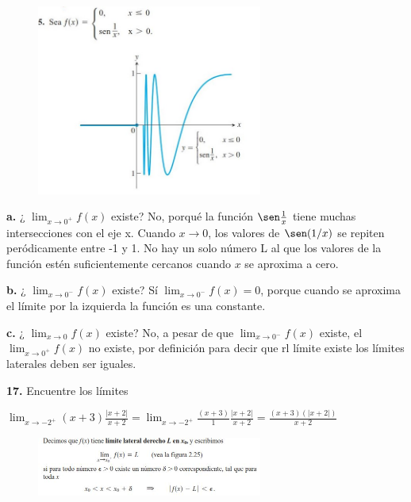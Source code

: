 \documentclass[12pt, letterpaper]{article}
\begin{document}
\begin{figure}[tbh]
\centering
\includegraphics[width=20em]{t11dos}
\end{figure}


\textbf{a.} ¿  $\lim_{ x \to 0^+} f(x)$ existe? No, porqué la función $\sen \frac{1}{x}$ tiene muchas intersecciones con el eje x. Cuando $x \to 0$, los valores de $ \sen (1/x)$ se repiten peródicamente entre -1 y 1. No hay un solo número L al que los valores de la función estén suficientemente cercanos cuando $x$ se aproxima a cero.


\textbf{b.} ¿ $\lim_{ x \to 0^-} f(x)$ existe? Sí $\lim_{ x \to 0^-} f(x) = 0$, porque cuando se aproxima el límite por la izquierda la función es una constante.


\textbf{c.} ¿ $\lim_{ x \to 0} f(x)$ existe? No, a pesar de que $\lim_{ x \to 0^-} f(x)$ existe, el $\lim_{ x \to 0^+} f(x)$ no existe, por definición para decir que rl límite existe los límites laterales deben ser iguales.

\textbf{17.} Encuentre los límites

$\lim_{x \to -2^+} (x+3) \frac{|x+2|}{x+2} = \lim_{x \to -2^+} \frac{(x+3)}{1}\frac{|x+2|}{x+2} = \frac{(x+3)(|x+2|)}{x+2}$ 


\begin{figure}[tbh]
\centering
\includegraphics[width=20em]{t11tres}
\end{figure}
\end{document}
